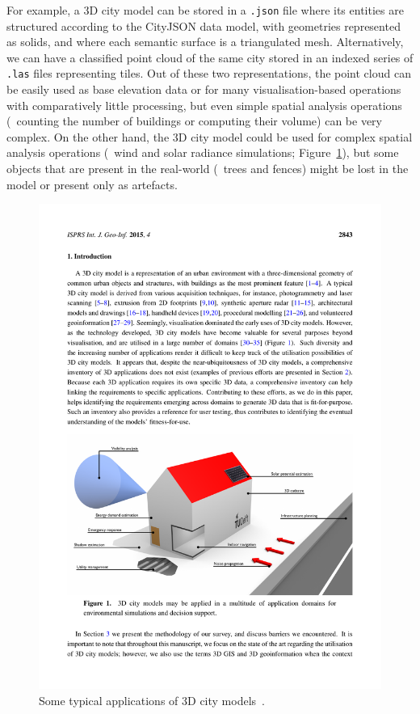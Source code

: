 For example, a 3D city model can be stored in a \texttt{.json} file where its entities are structured according to the CityJSON data model, with geometries represented as solids, and where each semantic surface is a triangulated mesh.
Alternatively, we can have a classified point cloud of the same city stored in an indexed series of \texttt{.las} files representing tiles.
Out of these two representations, the point cloud can be easily used as base elevation data or for many visualisation-based operations with comparatively little processing, but even simple spatial analysis operations (\eg\ counting the number of buildings or computing their volume) can be very complex.
On the other hand, the 3D city model could be used for complex spatial analysis operations (\eg\ wind and solar radiance simulations; Figure~\ref{fig:applications}), but some objects that are present in the real-world (\eg\ trees and fences) might be lost in the model or present only as artefacts.

\begin{figure}
\centering
\includegraphics[width=\linewidth]{figs/applications.pdf}
\caption[Some typical applications of 3D city models]{Some typical applications of 3D city models~\citep{Biljecki15a}.}%
\label{fig:applications}
\end{figure}

